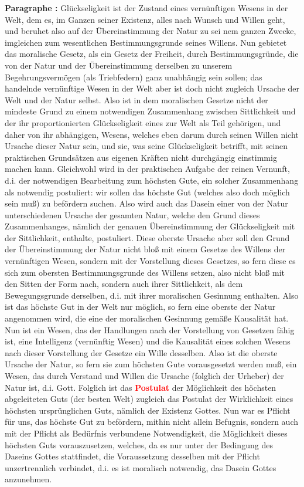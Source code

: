 \documentclass[a4paper,12pt,twoside]{book}
\newcommand{\match}[1]{\textcolor{red}{\textbf{#1}}}
\begin{document}
	\noindent\textbf{Paragraphe : }
	Glückseligkeit ist der Zustand eines vernünftigen Wesens in der Welt, dem es, im Ganzen seiner Existenz, alles nach Wunsch und Willen geht, und beruhet also auf der Übereinstimmung der Natur zu sei nem ganzen Zwecke, imgleichen zum wesentlichen Bestimmungsgrunde seines Willens. Nun gebietet das moralische Gesetz, als ein Gesetz der Freiheit, durch Bestimmungsgründe, die von der Natur und der Übereinstimmung derselben zu unserem Begehrungsvermögen (als Triebfedern) ganz unabhängig sein sollen; das handelnde vernünftige Wesen in der Welt aber ist doch nicht zugleich Ursache der Welt und der Natur selbst. Also ist in dem moralischen Gesetze nicht der mindeste Grund zu einem notwendigen Zusammenhang zwischen Sittlichkeit und der ihr proportionierten Glückseligkeit eines zur Welt als Teil gehörigen, und daher von ihr abhängigen, Wesens, welches eben darum durch seinen Willen nicht Ursache dieser Natur sein, und sie, was seine Glückseligkeit betrifft, mit seinen praktischen Grundsätzen aus eigenen Kräften nicht durchgängig einstimmig machen kann. Gleichwohl wird in der praktischen Aufgabe der reinen Vernunft, d.i. der notwendigen Bearbeitung zum höchsten Gute, ein solcher Zusammenhang als notwendig postuliert: wir sollen das höchste Gut (welches also doch möglich sein muß) zu befördern suchen. Also wird auch das Dasein einer von der Natur unterschiedenen Ursache der gesamten Natur, welche den Grund dieses Zusammenhanges, nämlich der genauen Übereinstimmung der Glückseligkeit mit der Sittlichkeit, enthalte, postuliert. Diese oberste Ursache aber soll den Grund der Übereinstimmung der Natur nicht bloß mit einem Gesetze des Willens der vernünftigen Wesen, sondern  mit der Vorstellung dieses Gesetzes, so fern diese es sich zum obersten Bestimmungsgrunde des Willens setzen, also nicht bloß mit den Sitten der Form nach, sondern auch ihrer Sittlichkeit, als dem Bewegungsgrunde derselben, d.i. mit ihrer moralischen Gesinnung enthalten. Also ist das höchste Gut in der Welt nur möglich, so fern eine oberste der Natur angenommen wird, die eine der moralischen Gesinnung gemäße Kausalität hat. Nun ist ein Wesen, das der Handlungen nach der Vorstellung von Gesetzen fähig ist, eine Intelligenz (vernünftig Wesen) und die Kausalität eines solchen Wesens nach dieser Vorstellung der Gesetze ein Wille desselben. Also ist die oberste Ursache der Natur, so fern sie zum höchsten Gute vorausgesetzt werden muß, ein Wesen, das durch Verstand und Willen die Ursache (folglich der Urheber) der Natur ist, d.i. Gott. Folglich ist das \match{Postulat} der Möglichkeit des höchsten abgeleiteten Guts (der besten Welt) zugleich das Postulat der Wirklichkeit eines höchsten ursprünglichen Guts, nämlich der Existenz Gottes. Nun war es Pflicht für uns, das höchste Gut zu befördern, mithin nicht allein Befugnis, sondern auch mit der Pflicht als Bedürfnis verbundene Notwendigkeit, die Möglichkeit dieses höchsten Guts vorauszusetzen, welches, da es nur unter der Bedingung des Daseins Gottes stattfindet, die Voraussetzung desselben mit der Pflicht unzertrennlich verbindet, d.i. es ist moralisch notwendig, das Dasein Gottes anzunehmen. 
	
\end{document}
